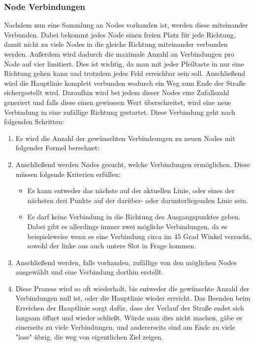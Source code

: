 \subsubsection{Node Verbindungen}\label{subsubsec:node-verbindungen}
Nachdem nun eine Sammlung an Nodes vorhanden ist, werden diese miteinander Verbunden.
Dabei bekommt jedes Node einen freien Platz für jede Richtung, damit nicht zu viele Nodes in die gleiche Richtung miteinander verbunden werden.
Außerdem wird dadurch die maximale Anzahl an Verbindungen pro Node auf vier limitiert.
Dies ist wichtig, da man mit jeder Pfeiltaste in nur eine Richtung gehen kann und trotzdem jedes Feld erreichbar sein soll.
Anschließend wird die Hauptlinie komplett verbunden wodurch ein Weg zum Ende der Straße sichergestellt wird.
Daraufhin wird bei jedem dieser Nodes eine Zufallszahl generiert und falls diese einen gewisseen Wert überschreitet, wird eine neue Verbindung in eine zufällige Richtung gestartet.
Diese Verbindung geht nach folgenden Schritten:
\begin{enumerate}
    \item Es wird die Anzahl der gewünschten Verbindeungen zu neuen Nodes mit folgender Formel berechnet:
    \item Anschließend werden Nodes gesucht, welche Verbindungen ermöglichen.
    Diese müssen folgende Kriterien erfüllen:
    \begin{itemize}
        \item Es kann entweder das nächste auf der aktuellen Linie, oder eines der nächsten drei Punkte auf der darüber- oder darunterliegenden Linie sein.
        \item Es darf keine Verbindung in die Richtung des Ausgangspunktes geben.
        Dabei gibt es allerdings immer zwei mögliche Verbindungen, da es beispielsweise wenn es eine Verbindung circa im 45 Grad Winkel versucht, sowohl der linke aus auch untere Slot in Frage kommen.
    \end{itemize}
    \item Anschließend werden, falls vorhanden, zufällige von den möglichen Nodes ausgewählt und eine Verbindung dorthin erstellt.
    \item Diese Prozess wird so oft wiederholt, bis entweder die gewünschte Anzahl der Verbindungen null ist, oder die Hauptlinie wieder erreicht.
    Das Beenden beim Erreichen der Hauptlinie sorgt dafür, dass der Verlauf der Straße endet sich langsam öffnet und wieder schließt.
    Würde man dies nicht machen, gäbe es einerseits zu viele Verbindungen, und andererseits sind am Ende zu viele "lose" übrig, die weg von eigentlichen Ziel zeigen.
\end{enumerate}

